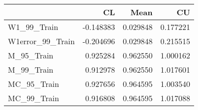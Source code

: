 \begin{tabular}{lrrr}
\toprule
{} &        CL &      Mean &        CU \\
\midrule
W1\_99\_Train      & -0.148383 &  0.029848 &  0.177221 \\
W1error\_99\_Train & -0.204696 &  0.029848 &  0.215515 \\
M\_95\_Train       &  0.925284 &  0.962550 &  1.000162 \\
M\_99\_Train       &  0.912978 &  0.962550 &  1.017601 \\
MC\_95\_Train      &  0.927656 &  0.964595 &  1.003540 \\
MC\_99\_Train      &  0.916808 &  0.964595 &  1.017088 \\
\bottomrule
\end{tabular}
